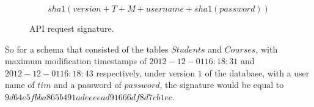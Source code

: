 \begin{figure}[h!]
\[
sha1(version + T + M + username + sha1(password))
\]
\caption{API request signature.}
\label{fig:signature}
\end{figure}

So for a schema that consisted of the tables $Students$ and $Courses$, with
maximum modification timestamps of $2012-12-01 16:18:31$ and
$2012-12-01 16:18:43$ respectively, under version $1$ of the database, with a
user name of $tim$ and a password of $password$, the signature would be
equal to \hbox{$9d64e5fbba865b491adeeeead91666df8d7cb1ec$}.





